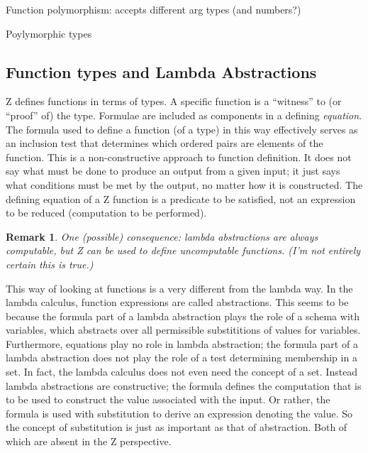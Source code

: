 \documentclass[12pt]{tufte-handout}
\numberwithin{equation}{subsection}
\numberwithin{equation}{subsection}
\newtheorem{remark}{Remark}
\begin{document}
  Function polymorphism: accepts different arg types (and numbers?)

  Poylymorphic types

  \subsection{Function types and Lambda Abstractions}
  \label{subs:functypes}

  Z defines functions in terms of types.  A specific function is a
  ``witness'' to (or ``proof'' of) the type.  Formulae are included as
  components in a defining \textit{equation}.  The formula used to
  define a function (of a type) in this way effectively serves as an
  inclusion test that determines which ordered pairs are elements of
  the function.  This is a non-constructive approach to function
  definition.  It does not say what must be done to produce an output
  from a given input; it just says what conditions must be met by the
  output, no matter how it is constructed.  The defining equation of a
  Z function is a predicate to be satisfied, not an expression to be
  reduced (computation to be performed).

  \begin{remark}
    One (possible) consequence: lambda abstractions are always
    computable, but Z can be used to define uncomputable functions.
    (I'm not entirely certain this is true.)
  \end{remark}

  This way of looking at functions is a very different from the lambda
  way.  In the lambda calculus, function expressions are called
  abstractions.  This seems to be because the formula part of a lambda
  abstraction plays the role of a schema with variables, which
  abstracts over all permissible substititions of values for
  variables.  Furthermore, equations play no role in lambda
  abstraction; the formula part of a lambda abstraction does not play
  the role of a test determining membership in a set.  In fact, the
  lambda calculus does not even need the concept of a
  set.  Instead lambda abstractions are constructive; the formula
  defines the computation that is to be used to construct the value
  associated with the input.  Or rather, the formula is used with
  substitution to derive an expression denoting the value.  So the
  concept of substitution is just as important as that of abstraction.
  Both of which are absent in the Z perspective.
\end{document}
